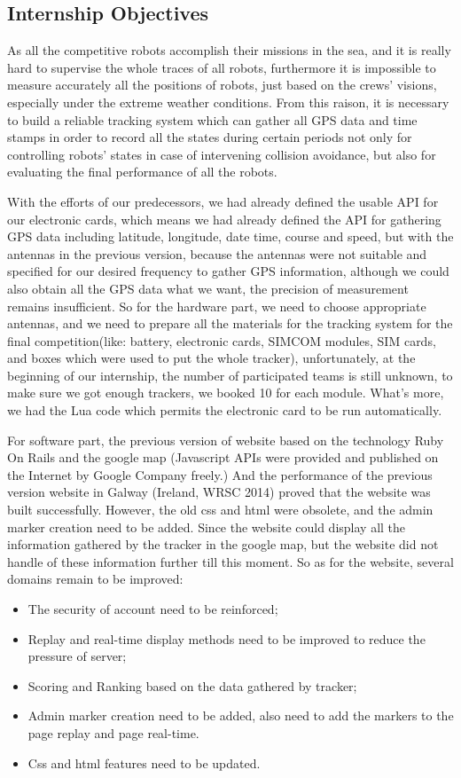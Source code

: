 \subsection{Internship Objectives}
As all the competitive robots accomplish their missions in the sea, and it is really hard to supervise the whole traces of all robots, furthermore it is impossible to measure accurately all the positions of robots, just based on the crews' visions, especially under the extreme weather conditions. From this raison, it is necessary to build a reliable tracking system which can gather all GPS data and time stamps in order to record all the states during certain periods not only for controlling robots' states in case of intervening collision avoidance, but also for evaluating the final performance of all the robots.

With the efforts of our predecessors, we had already defined the usable API for our electronic cards, which means we had already defined the API for gathering GPS data including latitude, longitude, date time, course and speed, but with the antennas in the previous version, because the antennas were not suitable and specified for our desired frequency to gather GPS information, although we could also obtain all the GPS data what we want, the precision of measurement remains insufficient. So for the hardware part, we need to choose appropriate antennas, and we need to prepare all the materials for the tracking system for the final competition(like: battery, electronic cards, SIMCOM modules, SIM cards, and boxes which were used to put the whole tracker), unfortunately, at the beginning of our internship, the number of participated teams is still unknown, to make sure we got enough trackers, we booked 10 for each module. What's more, we had the Lua code which permits the electronic card to be run automatically. 

For software part, the previous version of website based on the technology Ruby On Rails and the google map (Javascript APIs were provided and published on the Internet by Google Company freely.) And the performance of the previous version website in Galway (Ireland, WRSC 2014) proved that the website was built successfully. However, the old css and html were obsolete, and the admin marker creation need to be added. Since the website could display all the information gathered by the tracker in the google map, but the website did not handle of these information further till this moment. So as for the website, several domains remain to be improved:
\begin{itemize}
\item The security of account need to be reinforced; 
\item Replay and real-time display methods need to be improved to reduce the pressure of server;
\item Scoring and Ranking based on the data gathered by tracker;
\item Admin marker creation need to be added, also need to add the markers to the page replay and page real-time.
\item Css and html features need to be updated.
\end{itemize}


